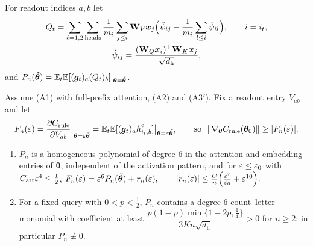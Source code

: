For readout indices $a,b$ let
\begin{gather*}
 Q_t=\sum_{\ell=1,2}\sum_{\mathrm{heads}}\frac{1}{m_i}\sum_{j\le i}\mathbf W_V\bm x_j\Bigl(\hat\psi_{ij}-\frac{1}{m_i}\sum_{l\le i}\hat\psi_{il}\Bigr),\qquad i=i_t,\\
 \hat\psi_{ij}=\frac{(\mathbf W_Q\bm x_i)^\top\mathbf W_K\bm x_j}{\sqrt{d_{\mathrm h}}},
\end{gather*}
and $P_n(\tilde{\bm\theta})=\mathbb E_t\mathbb E[(\bm g_t)_a(Q_t)_b]|_{\bm\theta=\tilde{\bm\theta}}$.

\begin{lemma}
\label{lem:leading}
Assume (A1) with full-prefix attention, (A2) and (A3$'$). Fix a readout entry $V_{ab}$ and let
\[
 F_n(\initscale)=\pd{\rulecredit}{V_{ab}}\Big|_{\bm\theta=\initscale\tilde{\bm\theta}}=\E_t\E[(\bm g_t)_ah^2_{i_t,b}]\big|_{\bm\theta=\initscale\tilde{\bm\theta}},\qquad\text{so }\ \|\nabla_{\bm\theta}\rulecredit(\bm\theta_0)\|\ge|F_n(\initscale)|.
\]
\begin{enumerate}[label=(\roman*),leftmargin=*,itemsep=3pt,topsep=4pt]
\item $P_n$ is a homogeneous polynomial of degree $6$ in the attention and embedding entries of $\tilde{\bm\theta}$, independent of the activation
pattern, and for $\varepsilon\le\varepsilon_0$ with $C_{\mathrm{att}}\varepsilon^4\le\frac{1}{2}$,
 $F_n(\varepsilon)=\varepsilon^6P_n(\tilde{\bm\theta})+r_n(\varepsilon),\qquad |r_n(\varepsilon)|\le\frac{C}{n}\Bigl(\frac{\varepsilon^7}{\varepsilon_0}+\varepsilon^{10}\Bigr).$ 
\item For a fixed query with $0<p<\frac{1}{2}$, $P_n$ contains a degree-$6$ count--letter monomial with coefficient at least
$\dfrac{p(1-p)\min\{1-2p,\frac{1}{4}\}}{3Kn\sqrt{d_{\mathrm h}}}>0$ for $n\ge2$; in particular $P_n\not\equiv0$.
\end{enumerate}
\end{lemma}

